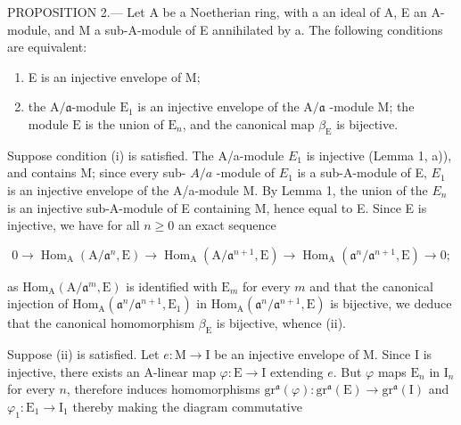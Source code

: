 PROPOSITION 2.--- Let A be a Noetherian ring, with a an ideal of A, E an A-module, and M a sub-A-module of E annihilated by a. The following conditions are equivalent:

\begin{enumerate}
\def\labelenumi{(\roman{enumi})}
\item
  E is an injective envelope of M;
\item
  the \(\mathrm{A}/\mathfrak{a}\)-module \(\mathrm{E}_1\) is an injective envelope of the \(\mathrm{A}/\mathfrak{a}\) -module \(\mathrm{M}\); the module \(\mathrm{E}\) is the union of \(\mathrm{E}_n\), and the canonical map \(\beta_{\mathrm{E}}\) is bijective.
\end{enumerate}

Suppose condition (i) is satisfied. The A/a-module \(E_{1}\) is injective (Lemma 1, a)), and contains M; since every sub- \(A/a\) -module of \(E_{1}\) is a sub-A-module of E, \(E_{1}\) is an injective envelope of the A/a-module M. By Lemma 1, the union of the \(E_{n}\) is an injective sub-A-module of E containing M, hence equal to E. Since E is injective, we have for all \(n \geqslant 0\) an exact sequence

\[
0 \to \operatorname{Hom} _ {\mathrm{A}} (\mathrm{A} / \mathfrak {a} ^ {n}, \mathrm{E}) \longrightarrow \operatorname{Hom} _ {\mathrm{A}} (\mathrm{A} / \mathfrak {a} ^ {n + 1}, \mathrm{E}) \longrightarrow \operatorname{Hom} _ {\mathrm{A}} (\mathfrak {a} ^ {n} / \mathfrak {a} ^ {n + 1}, \mathrm{E}) \to 0;
\]

as \(\mathrm{Hom}_{\mathrm{A}}(\mathrm{A}/\mathfrak{a}^{m},\mathrm{E})\) is identified with \(\mathrm{E}_{m}\) for every \(m\) and that the canonical injection of \(\mathrm{Hom}_{\mathrm{A}}(\mathfrak{a}^{n}/\mathfrak{a}^{n+1},\mathrm{E}_{1})\) in \(\mathrm{Hom}_{\mathrm{A}}(\mathfrak{a}^{n}/\mathfrak{a}^{n+1},\mathrm{E})\) is bijective, we deduce that the canonical homomorphism \(\beta_{\mathrm{E}}\) is bijective, whence (ii).

Suppose (ii) is satisfied. Let \(e: \mathrm{M} \to \mathrm{I}\) be an injective envelope of M. Since I is injective, there exists an A-linear map \(\varphi: \mathrm{E} \to \mathrm{I}\) extending \(e\). But \(\varphi\) maps \(\mathrm{E}_n\) in \(\mathrm{I}_n\) for every \(n\), therefore induces homomorphisms \(\mathrm{gr}^{\mathfrak{a}}(\varphi):\mathrm{gr}^{\mathfrak{a}}(\mathrm{E})\to \mathrm{gr}^{\mathfrak{a}}(\mathrm{I})\) and \(\varphi_{1}:\mathrm{E}_{1}\rightarrow \mathrm{I}_{1}\) thereby making the diagram commutative

